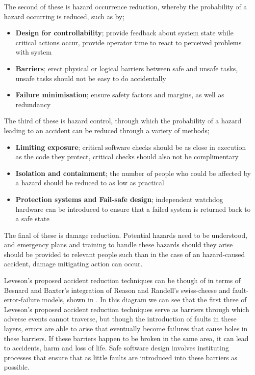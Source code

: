 \documentclass{cshonours}
\begin{document}
The second of these is hazard occurrence reduction, whereby the probability of a hazard occurring is reduced, such as by;
 \begin{itemize}
  \item \textbf{Design for controllability}; provide feedback about system state while critical actions occur, provide operator time to react to perceived problems with system
  \item \textbf{Barriers}; erect physical or logical barriers between safe and unsafe tasks, unsafe tasks should not be easy to do accidentally
  \item \textbf{Failure minimisation}; ensure safety factors and margins, as well as redundancy
 \end{itemize}
 
The third of these is hazard control, through which the probability of a hazard leading to an accident can be reduced through a variety of methods;
 \begin{itemize}
  \item \textbf{Limiting exposure}; critical software checks should be as close in execution as the code they protect, critical checks should also not be complimentary
  \item \textbf{Isolation and containment}; the number of people who could be affected by a hazard should be reduced to as low as practical
  \item \textbf{Protection systems and Fail-safe design}; independent watchdog hardware can be introduced to ensure that a failed system is returned back to a safe state
 \end{itemize}

The final of these is damage reduction. Potential hazards need to be understood, and emergency plans and training to handle these hazards should they arise should be provided to relevant people such than in the case of an hazard-caused accident, damage mitigating action can occur.

Leveson's proposed accident reduction techniques can be though of in terms of Besnard and Baxter's \cite{besnard2003human} integration of Reason and Randell's swiss-cheese and fault-error-failure models, shown in . In this diagram we can see that the first three of Leveson's proposed accident reduction techniques serve as barriers through which adverse events cannot traverse, but though the introduction of faults in these layers, errors are able to arise that eventually become failures that cause holes in these barriers. If these barriers happen to be broken in the same area, it can lead to accidents, harm and loss of life. Safe software design involves instituting processes that ensure that as little faults are introduced into these barriers as possible.
\end{document}

